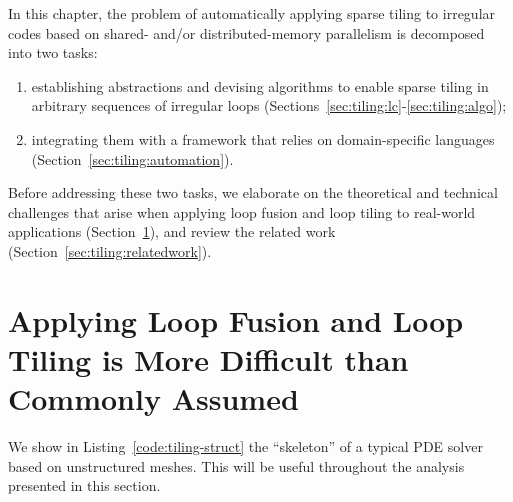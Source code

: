 In this chapter, the problem of automatically applying sparse tiling to irregular codes based on shared- and/or distributed-memory parallelism is decomposed into two tasks:
\begin{enumerate}
\item establishing abstractions and devising algorithms to enable sparse tiling in arbitrary sequences of irregular loops (Sections~\ref{sec:tiling:lc}-\ref{sec:tiling:algo});
\item integrating them with a framework that relies on domain-specific languages (Section~\ref{sec:tiling:automation}).
\end{enumerate}
Before addressing these two tasks, we elaborate on the theoretical and technical challenges that arise when applying loop fusion and loop tiling to real-world applications (Section~\ref{sec:tiling:difficult}), and review the related work (Section~\ref{sec:tiling:relatedwork}).  



\section{Applying Loop Fusion and Loop Tiling is More Difficult than Commonly Assumed}
\label{sec:tiling:difficult}
We show in Listing~\ref{code:tiling-struct} the ``skeleton'' of a typical PDE solver based on unstructured meshes. This will be useful throughout the analysis presented in this section.

